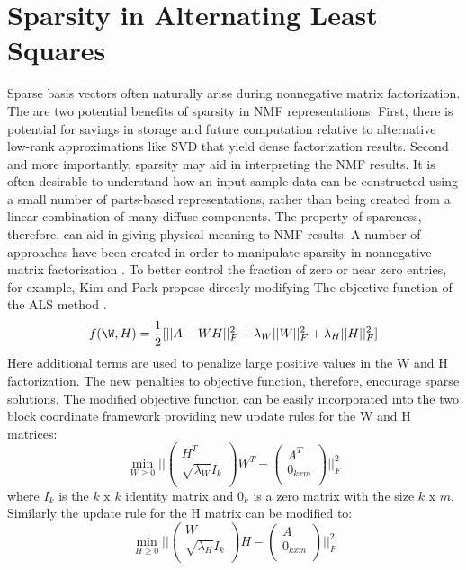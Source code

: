 \documentclass[final,leqno,onefignum,onetabnum]{siamltex1213}
\begin{document}
\section{Sparsity in Alternating Least Squares} Sparse basis vectors often naturally arise during nonnegative matrix factorization. The are two potential benefits of sparsity in NMF representations. First, there is potential for savings in storage and future computation relative to alternative low-rank approximations like SVD that yield dense factorization results. Second and more importantly, sparsity may aid in interpreting the NMF results. It is often desirable to understand how an input sample data can be constructed using a small number of parts-based representations, rather than being created from a linear combination of many diffuse components. The property of spareness, therefore, can aid in giving physical meaning to NMF results. A number of approaches have been created in order to manipulate sparsity in nonnegative matrix factorization \cite{Li, Kim1, Kim2}. To better control the fraction of zero or near zero entries, for example, Kim and Park propose directly modifying The objective function of the ALS method \cite{Kim2}. 
\begin{equation}\label{ObjSpar}
 f( \W,H) = \frac{1}{2} [|| A - WH ||^{2}_{F} + \lambda_W || W ||^{2}_{F} + \lambda_H || H ||^{2}_{F} ]
\end{equation}
Here additional terms are used to penalize large positive values in the W and H factorization. The new penalties to objective function, therefore, encourage sparse solutions. The modified objective function can be easily incorporated into the two block coordinate framework providing new update rules for the W and H matrices:
\begin{equation}
    \min_{W \ge 0} || \left( \begin{array}{c} H^T   \\  \sqrt{\lambda_W}I_k \\ \end{array} \right) W^T- \left( \begin{array}{c} A^T   \\  0_{kxm} \\ \end{array} \right) ||^{2}_{F} 
\end{equation}
where $I_k$ is the $k\text{ x }k$ identity matrix and  $0_k$ is a zero matrix with the size $k\text{ x }m$. Similarly the update rule for the H matrix can be modified to: 
\begin{equation}
    \min_{H \ge 0} || \left( \begin{array}{c} W   \\  \sqrt{\lambda_H}I_k \\ \end{array} \right) H- \left( \begin{array}{c} A   \\  0_{kxm} \\ \end{array} \right) ||^{2}_{F} 
\end{equation}
\end{document}
